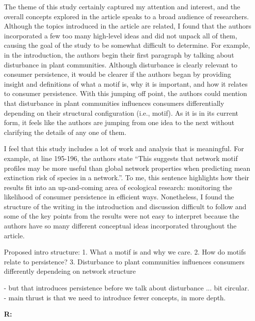 \documentclass[12pt]{article}
\newenvironment{refquote}{\bigskip \begin{it}}{\end{it}\medskip}
\begin{document}
    \begin{refquote}

        The theme of this study certainly captured my attention and interest, and the overall concepts explored in the article speaks to a broad audience of researchers. Although the topics introduced in the article are related, I found that the authors incorporated a few too many high-level ideas
        and did not unpack all of them, causing the goal of the study to be somewhat difficult to determine. For example, in the introduction, the authors begin their first paragraph by talking about disturbance in plant communities. Although disturbance is clearly relevant to consumer persistence, it would be clearer if the authors began by providing insight and definitions of what a motif is, why it is important, and how it relates to consumer persistence. With this jumping off point, the authors could mention that disturbance in plant communities influences consumers differentially depending on their structural configuration (i.e., motif). As it is in its current form, it feels like the authors are jumping from one idea to the next without clarifying the details of any one of them.

        I feel that this study includes a lot of work and analysis that is meaningful. For example, at line 195-196, the authors state “This suggests that network motif profiles may be more useful than global network properties when predicting mean extinction risk of species in a network.”. To me, this sentence highlights how their results fit into an up-and-coming area of ecological research: monitoring the likelihood of consumer persistence in efficient ways. Nonetheless, I found the structure of the writing in the introduction and discussion difficult to follow and some of the key points from the results were not easy to interpret because the authors have so many different conceptual ideas incorporated throughout the article.

    \end{refquote}

Proposed intro structure: 
1. What a motif is and why we care. 2. How do motifs relate to persistence? 3. Disturbance to plant communities influences consumers differently dependeing on network structure 

- but that introduces persistence before we talk about disturbance ... bit circular. 
- main thrust is that we need to introduce fewer concepts, in more depth.

    \textbf{R:} 
\end{document}
